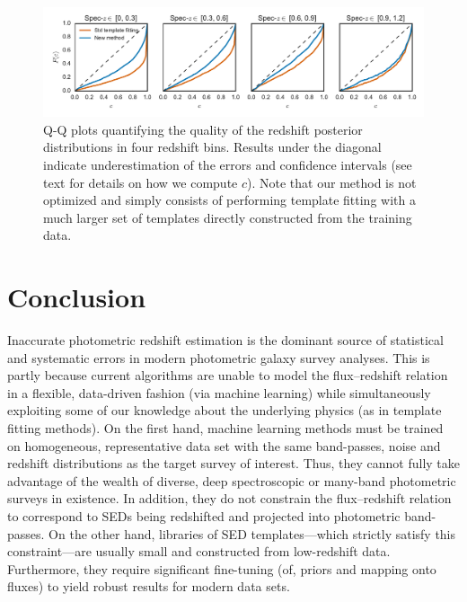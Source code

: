 \documentclass[aps,prd,showpacs,superscriptaddress,groupedaddress]{revtex4}  %
\begin{document}
\begin{figure}
\includegraphics[width=18cm]{cipdfs.pdf}
\caption{Q-Q plots quantifying the quality of the redshift posterior distributions in four redshift bins. 
Results under the diagonal indicate underestimation of the \photoz errors and confidence intervals (see text for details on how we compute $c$).
Note that our method is not optimized and simply consists of performing template fitting with a much larger set of templates directly constructed from the training data.
}
\label{fig:cipdfs}
\end{figure}



\section{Conclusion}\label{sec:concl}


Inaccurate photometric redshift estimation is the dominant source of statistical and systematic errors in modern photometric galaxy survey analyses.
This is partly because current \photoz algorithms are unable to model the flux--redshift relation in a flexible, data-driven fashion (\eg via machine learning) while simultaneously exploiting some of our knowledge about the underlying physics (as in template fitting methods).
On the first hand, machine learning methods must be trained on homogeneous, representative data set with the same band-passes, noise and redshift distributions as the target survey of interest.
Thus, they cannot fully take advantage of the wealth of diverse, deep spectroscopic or many-band photometric surveys in existence.
In addition, they do not constrain the flux--redshift relation to correspond to SEDs being redshifted and projected into photometric band-passes. 
On the other hand, libraries of SED templates---which strictly satisfy this constraint---are usually small and constructed from low-redshift data. 
Furthermore, they require significant fine-tuning (of, \eg priors and mapping onto fluxes) to yield robust results for modern data sets. 
\end{document}
